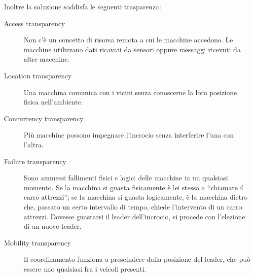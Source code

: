 \documentclass{memoir}
\begin{document}
Inoltre la soluzione soddisfa le seguenti trasparenza:
\begin{description}
\item[Access transparency] Non c'è un concetto di risorsa remota a cui le
  macchine accedono. Le macchine utilizzano dati ricavati da sensori oppure
  messaggi ricevuti da altre macchine.
\item[Location transparency] Una macchina comunica con i vicini senza conoscerne
  la loro posizione fisica nell'ambiente.
\item[Concurrency transparency] Più macchine possono impegnare l'incrocio senza
  interferire l'una con l'altra.
\item[Failure transparency] Sono ammessi fallimenti fisici e logici delle
  macchine in un qualsiasi momento. Se la macchina si guasta fisicamente è lei
  stessa a ``chiamare il carro attrezzi''; se la macchina si guasta logicamente,
  è la macchina dietro che, passato un certo intervallo di tempo, chiede
  l'intervento di un carro attrezzi. Dovesse guastarsi il leader dell'incrocio,
  si procede con l'elezione di un nuovo leader.
\item[Mobility transparency] Il coordinamento funziona a prescindere dalla
  posizione del leader, che può essere uno qualsiasi fra i veicoli presenti.
\end{description}


\newpage
\end{document}
